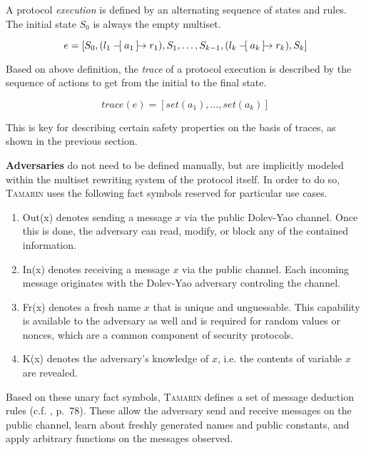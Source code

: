 \noindent
A protocol \textit{execution} is defined by an alternating sequence of states and rules. The initial state $S_0$ is always the empty multiset.

\begin{equation}\label{eq:execution}
    e = [S_0, (l_1 \tracerule{a_1} r_1), S_1, \ldots, S_{k-1}, (l_k \tracerule{a_k} r_k), S_k]
\end{equation}

\noindent
Based on above definition, the \textit{trace} of a protocol execution is described by the sequence of actions to get from the initial to the final state.

\begin{equation}
    trace(e) = [set(a_1), \ldots, set(a_k)]
\end{equation}

\noindent
This is key for describing certain safety properties on the basis of traces, as shown in the previous section.

\textbf{Adversaries} do not need to be defined manually, but are implicitly modeled within the multiset rewriting system of the protocol itself.
In order to do so, \textsc{Tamarin} uses the following fact symbols reserved for particular use cases.

\begin{enumerate}[label=--]
    \item \textsf{Out(x)} denotes sending a message $x$ via the public Dolev-Yao channel. Once this is done, the adversary can read, modify, or block any of the contained information.
    \item \textsf{In(x)} denotes receiving a message $x$ via the public channel. Each incoming message originates with the Dolev-Yao adversary controling the channel.
    \item \textsf{Fr(x)} denotes a fresh name $x$ that is unique and unguessable. This capability is available to the adversary as well and is required for random values or nonces, which are a common component of security protocols.
    \item \textsf{K(x)} denotes the adversary's knowledge of $x$, i.e. the contents of variable $x$ are revealed.
\end{enumerate}

\noindent
Based on these unary fact symbols, \textsc{Tamarin} defines a set of message deduction rules (c.f. \cite{meier2013advancing}, p.~78).
These allow the adversary send and receive messages on the public channel, learn about freshly generated names and public constants, and apply arbitrary functions on the messages observed.

